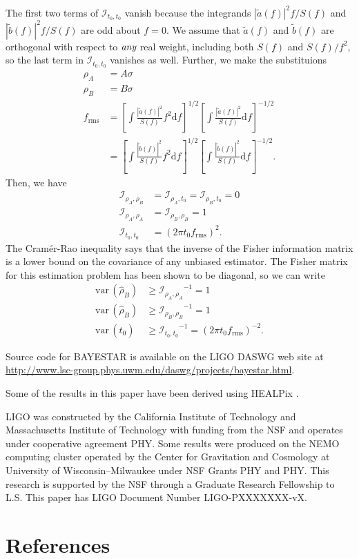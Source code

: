 \documentclass{iopart}
\begin{document}
%
The first two terms of $\mathcal{I}_{t_0,t_0}$ vanish because the integrands $|\tilde{a}(f)|^2 f / S(f)$ and $|\tilde{b}(f)|^2 f / S(f)$ are odd about $f = 0$.  We assume that $\tilde{a}(f)$ and $\tilde{b}(f)$ are orthogonal with respect to $\emph{any}$ real weight, including both $S(f)$ and $S(f) / f^2$, so the last term in $\mathcal{I}_{t_0,t_0}$ vanishes as well.  Further, we make the substituions
%
\begin{eqnarray*}
	\rho_A &= A \sigma \\
	\rho_B &= B \sigma \\
	f_\mathrm{rms} &= \left[ \int \frac{|\tilde{a}(f)|^2}{S(f)} f^2\mathrm{d}f \right] ^ {1/2} \left[\int \frac{|\tilde{a}(f)|^2}{S(f)} \mathrm{d}f \right] ^ {-1/2} \\
	&=  \left[ \int \frac{|\tilde{b}(f)|^2}{S(f)} f^2\mathrm{d}f \right] ^ {1/2} \left[\int \frac{|\tilde{b}(f)|^2}{S(f)} \mathrm{d}f \right] ^ {-1/2}.
\end{eqnarray*}
%
Then, we have
%
\begin{eqnarray*}
	\mathcal{I}_{\rho_A,\rho_B} &= \mathcal{I}_{\rho_A,t_0} = \mathcal{I}_{\rho_B,t_0} = 0 \\
	\mathcal{I}_{\rho_A,\rho_A} &= \mathcal{I}_{\rho_B,\rho_B} = 1 \\
	\mathcal{I}_{t_0,t_0} &= (2 \pi t_0 f_\mathrm{rms})^2.
\end{eqnarray*}
%
The Cram\'{e}r-Rao inequality says that the inverse of the Fisher information matrix is a lower bound on the covariance of any unbiased estimator.  The Fisher matrix for this estimation problem has been shown to be diagonal, so we can write
%
\begin{eqnarray}
	\mathrm{var}\, (\hat{\rho}_B) &\geq {\mathcal{I}_{\rho_A,\rho_A}}^{-1} = 1 \\
	\mathrm{var}\, (\hat{\rho}_B) &\geq {\mathcal{I}_{\rho_B,\rho_B}}^{-1} = 1 \\
	\mathrm{var}\, (\hat{t}_0) &\geq {\mathcal{I}_{t_0,t_0}}^{-1} = (2 \pi t_0 f_\mathrm{rms})^{-2}.
\end{eqnarray}


\ack Source code for \ac{BAYESTAR} is available on the \acs{LIGO} \acl{DASWG} web site at \url{http://www.lsc-group.phys.uwm.edu/daswg/projects/bayestar.html}.

Some of the results in this paper have been derived using HEALPix \cite{healpix}.

\acs{LIGO} was constructed by the California Institute of Technology and Massachusetts Institute of Technology with funding from the \ac{NSF} and operates under cooperative agreement PHY.  Some results were produced on the NEMO computing cluster operated by the Center for Gravitation and Cosmology at University of Wisconsin\nobreakdashes--Milwaukee under \ac{NSF} Grants PHY and PHY.  This research is supported by the \ac{NSF} through a Graduate Research Fellowship to L.S.  This paper has \acs{LIGO} Document Number \acs{LIGO}\nobreakdashes-PXXXXXXX\nobreakdashes-vX.


\section*{References}


\end{document}
